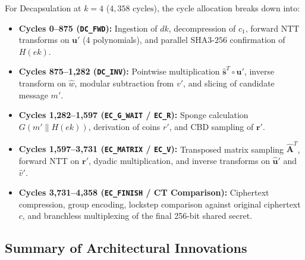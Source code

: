 For Decapsulation at $k=4$ ($4,358\text{ cycles}$), the cycle allocation breaks down into:
\begin{itemize}
    \item \textbf{Cycles 0--875 (\texttt{DC\_FWD}):} Ingestion of $dk$, decompression of $c_1$, forward NTT transforms on $\mathbf{u}'$ ($4$ polynomials), and parallel $\text{SHA3-256}$ confirmation of $H(ek)$.
    \item \textbf{Cycles 875--1,282 (\texttt{DC\_INV}):} Pointwise multiplication $\hat{\mathbf{s}}^T \circ \hat{\mathbf{u}}'$, inverse transform on $\hat{w}$, modular subtraction from $v'$, and slicing of candidate message $m'$.
    \item \textbf{Cycles 1,282--1,597 (\texttt{EC\_G\_WAIT} / \texttt{EC\_R}):} Sponge calculation $G(m' \parallel H(ek))$, derivation of coins $r'$, and CBD sampling of $\mathbf{r}'$.
    \item \textbf{Cycles 1,597--3,731 (\texttt{EC\_MATRIX} / \texttt{EC\_V}):} Transposed matrix sampling $\hat{\mathbf{A}}^T$, forward NTT on $\mathbf{r}'$, dyadic multiplication, and inverse transforms on $\hat{\mathbf{u}}'$ and $\hat{v}'$.
    \item \textbf{Cycles 3,731--4,358 (\texttt{EC\_FINISH} / CT Comparison):} Ciphertext compression, group encoding, lockstep comparison against original ciphertext $c$, and branchless multiplexing of the final 256-bit shared secret.
\end{itemize}

\subsection{Summary of Architectural Innovations}
\label{sec:arch_summary}


